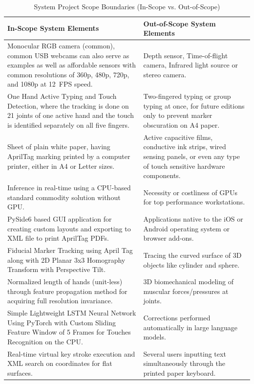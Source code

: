 \begin{table}[H]
\centering
\caption{System Project Scope Boundaries (In-Scope vs. Out-of-Scope)}
\label{tab:project_scope}
\small
\begin{tabularx}{\textwidth}{p{} p{}}
\toprule
\textbf{In-Scope System Elements} & \textbf{Out-of-Scope System Elements} \\
\midrule
Monocular RGB camera (common), common USB webcams can also serve as examples as well as affordable sensors with common resolutions of 360p, 480p, 720p, and 1080p at 12~FPS speed. & Depth sensor, Time-of-flight camera, Infrared light source or stereo camera. \\
\addlinespace
One Hand Active Typing and Touch Detection, where the tracking is done on 21 joints of one active hand and the touch is identified separately on all five fingers. & Two-fingered typing or group typing at once, for future editions only to prevent marker obscuration on A4 paper. \\
\addlinespace
Sheet of plain white paper, having AprilTag marking printed by a computer printer, either in A4 or Letter sizes. & Active capacitive films, conductive ink strips, wired sensing panels, or even any type of touch sensitive hardware components. \\
\addlinespace
Inference in real-time using a CPU-based standard commodity solution without GPU. & Necessity or costliness of GPUs for top performance workstations. \\
\addlinespace
PySide6 based GUI application for creating custom layouts and exporting to XML file to print AprilTag PDFs. & Applications native to the iOS or Android operating system or browser add-ons. \\
\addlinespace
Fiducial Marker Tracking using April Tag along with 2D Planar 3x3 Homography Transform with Perspective Tilt. & Tracing the curved surface of 3D objects like cylinder and sphere. \\
\addlinespace
Normalized length of hands (unit-less) through feature propagation method for acquiring full resolution invariance. & 3D biomechanical modeling of muscular forces/pressures at joints. \\
\addlinespace
Simple Lightweight LSTM Neural Network Using PyTorch with Custom Sliding Feature Window of 5 Frames for Touches Recognition on the CPU. & Corrections performed automatically in large language models. \\
\addlinespace
Real-time virtual key stroke execution and XML search on coordinates for flat surfaces. & Several users inputting text simultaneously through the printed paper keyboard. \\
\bottomrule
\end{tabularx}
\end{table}

